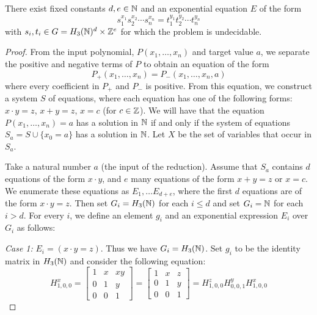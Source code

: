 \documentclass[11pt, titlepage]{article}
\begin{document}
\begin{proposition}
  There exist fixed constants $d,e \in \mathbb{N}$ and an exponential
  equation $E$ of the form
  \[ s_1^{x_1} s_2^{x_2}\cdots s_n^{x_n} = t_1^{y_1} t_2^{y_2}\cdots
    t_n^{y_n} \] with $s_i, t_i \in G = H_3(\mathbb{N})^d \times \mathbb{Z}^e$ for which the
   problem is undecidable.
\end{proposition}

\begin{proof}
  From the input polynomial, $P(x_1, \ldots, x_n)$ and target value
  $a$, we separate the positive and negative terms of $P$ to obtain an
  equation of the form
  \[
    P_+(x_1, \ldots, x_n) = P_-(x_1, \ldots, x_n, a)
  \]
  where every coefficient in $P_+$ and $P_-$ is positive. From this
  equation, we construct a system $S$ of equations, where each
  equation has one of the following forms: $x\cdot y = z$,
  $x+y = z$, $x = c$ (for $c \in \mathbb{Z}$).  We will have that the equation
  $P(x_1,\ldots, x_n) = a$ has a solution in $\mathbb{N}$ if and only if the
  system of equations $S_a = S \cup \{x_0 = a\}$ has a solution in
  $\mathbb{N}$. Let $X$ be the set of variables that occur in $S_a$.

  Take a natural number $a$ (the input of the reduction). Assume that
  $S_a$ contains $d$ equations of the form $x\cdot y$, and $e$ many
  equations of the form $x+y = z$ or $x = c$. We enumerate these
  equations as $E_1, \ldots E_{d+e}$, where the first $d$ equations
  are of the form $x\cdot y = z$. Then set $G_i = H_3(\mathbb{N})$ for each
  $i \leq d$ and set $G_i = \mathbb{N}$ for each $i > d$. For every $i$, we
  define an element $g_i$ and an exponential expression $E_i$ over
  $G_i$ as follows:

  \textit{Case 1:} $E_i = (x \cdot y = z)$. Thus we have
  $G_i = H_3(\mathbb{N})$. Set $g_i$ to be the identity matrix in $H_3(\mathbb{N})$
  and consider the following equation:
  \[
    H^x_{1,0,0} =
    \begin{bmatrix}
      1 & x & xy \\
      0 & 1 & y \\
      0 & 0 & 1
    \end{bmatrix} = 
    \begin{bmatrix}
      1 & x & z \\
      0 & 1 & y \\
      0 & 0 & 1
    \end{bmatrix} = 
    H^z_{1,0,0} H^y_{0,0,1} H^x_{1,0,0}
  \]


\end{proof}
\end{document}
